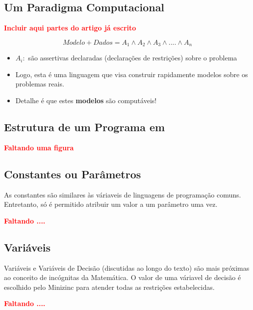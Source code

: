 \subsection{Um Paradigma Computacional}

{\bf \textcolor{red}{Incluir aqui partes do artigo já escrito}}


$$ Modelo + Dados = A_1 \wedge A_2 \wedge A_3 \wedge  ....  \wedge  A_n $$

\begin{itemize}
  \item 
 $A_i: $ são assertivas declaradas (declarações de restrições) sobre o problema

  \item  Logo, esta é uma linguagem  que visa construir rapidamente
modelos sobre os problemas reais.

  \item  Detalhe é que estes \textbf{modelos} são computáveis!


\end{itemize}




\subsection{Estrutura de um Programa em \minizinc}

{\bf \textcolor{red}{Faltando uma figura}}


\subsection{Constantes ou Parâmetros}



As constantes são similares às váriaveis de linguagens de programação comuns. Entretanto, só é permitido atribuir 
um valor a um parâmetro uma vez.

{\bf \textcolor{red}{Faltando ....}}

\subsection{Variáveis}

Variáveis e Variáveis de Decisão (discutidas ao longo do texto) são mais próximas ao conceito de incógnitas da Matemática. O valor de uma váriavel de decisão 
é escolhido pelo Minizinc para atender todas as restrições estabelecidas.


{\bf \textcolor{red}{Faltando ....}}



